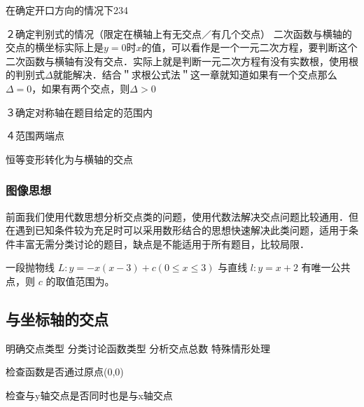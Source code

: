 


在确定开口方向的情况下234

２确定判别式的情况（限定在横轴上有无交点／有几个交点）
二次函数与横轴的交点的横坐标实际上是\(y=0\)时\(x\)的值，可以看作是一个一元二次方程，要判断这个二次函数与横轴有没有交点．实际上就是判断一元二次方程有没有实数根，使用根的判别式\(\Delta\)就能解决．结合＂求根公式法＂这一章就知道如果有一个交点那么\(\Delta=0\)，如果有两个交点，则\(\Delta>0\)



３确定对称轴在题目给定的范围内


４范围两端点




恒等变形转化为与横轴的交点






\subsubsection*{图像思想}

前面我们使用代数思想分析交点类的问题，使用代数法解决交点问题比较通用．但在遇到已知条件较为充足时可以采用数形结合的思想快速解决此类问题，适用于条件丰富无需分类讨论的题目，缺点是不能适用于所有题目，比较局限．

\begin{example}
一段抛物线 \( L: y = -x (x-3) + c \)\( (0 \leq x \leq 3) \) 与直线 \( l: y = x + 2 \) 有唯一公共点，则 \( c \) 的取值范围为\underline{\hspace{4em}}。
\end{example}

\subsection{与坐标轴的交点}
明确交点类型
分类讨论函数类型
分析交点总数
特殊情形处理

检查函数是否通过原点(0,0)

检查与y轴交点是否同时也是与x轴交点
